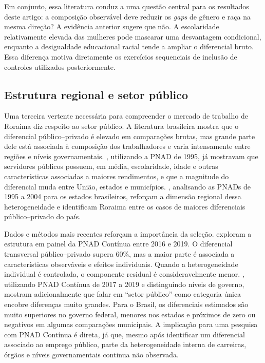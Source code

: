 \documentclass[12pt]{article}
\begin{document}
Em conjunto, essa literatura conduz a uma questão central para os resultados deste artigo: a 
composição observável deve reduzir os \textit{gaps} de gênero e raça na mesma direção? A evidência 
anterior sugere que não. A escolaridade relativamente elevada das mulheres pode mascarar 
uma desvantagem condicional, enquanto a desigualdade educacional racial tende a ampliar 
o diferencial bruto. Essa diferença motiva diretamente os exercícios sequenciais de inclusão 
de controles utilizados posteriormente.

\subsection{Estrutura regional e setor público}

Uma terceira vertente necessária para compreender o mercado de trabalho de Roraima diz 
respeito ao setor público. A literatura brasileira mostra que o diferencial público–privado 
é elevado em comparações brutas, mas grande parte dele está associada à composição dos 
trabalhadores e varia intensamente entre regiões e níveis governamentais. \citet{foguel2000}, 
utilizando a PNAD de 1995, já mostravam que servidores públicos possuem, em média, 
escolaridade, idade e outras características associadas a maiores rendimentos, e que a 
magnitude do diferencial muda entre União, estados e municípios. \citet{moriconi2009}, 
analisando as PNADs de 1995 a 2004 para os estados brasileiros, reforçam a dimensão regional 
dessa heterogeneidade e identificam Roraima entre os casos de maiores diferenciais 
público–privado do país.

Dados e métodos mais recentes reforçam a importância da seleção. \citet{mattos2022} exploram 
a estrutura em painel da PNAD Contínua entre 2016 e 2019. O diferencial transversal 
público–privado supera 60\%, mas a maior parte é associada a características observáveis e 
efeitos individuais. Quando a heterogeneidade individual é controlada, o componente residual 
é consideravelmente menor. \citet{baez2021}, utilizando PNAD Contínua de 2017 a 2019 e 
distinguindo níveis de governo, mostram adicionalmente que falar em “setor público” como 
categoria única encobre diferenças muito grandes. Para o Brasil, os diferenciais estimados 
são muito superiores no governo federal, menores nos estados e próximos de zero ou negativos 
em algumas comparações municipais. A implicação para uma pesquisa com PNAD Contínua é 
direta, já que, mesmo após identificar um diferencial associado ao emprego público, parte da 
heterogeneidade interna de carreiras, órgãos e níveis governamentais continua não observada. 
\end{document}
